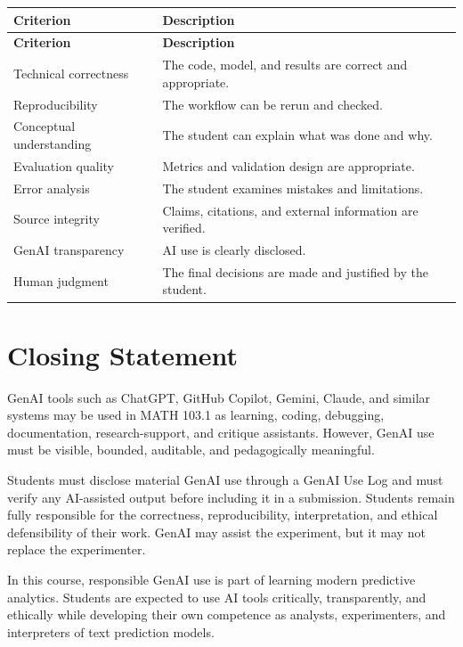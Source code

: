 \documentclass[11pt]{article}
\newcommand{\coursecode}{MATH 103.1}
\begin{document}
\begin{longtable}{p{}p{}}
\toprule
\textbf{Criterion} & \textbf{Description} \\
\midrule
\endfirsthead
\toprule
\textbf{Criterion} & \textbf{Description} \\
\midrule
\endhead
\bottomrule
\endfoot
Technical correctness & The code, model, and results are correct and appropriate. \\
Reproducibility & The workflow can be rerun and checked. \\
Conceptual understanding & The student can explain what was done and why. \\
Evaluation quality & Metrics and validation design are appropriate. \\
Error analysis & The student examines mistakes and limitations. \\
Source integrity & Claims, citations, and external information are verified. \\
GenAI transparency & AI use is clearly disclosed. \\
Human judgment & The final decisions are made and justified by the student. \\
\end{longtable}

\section{Closing Statement}

GenAI tools such as ChatGPT, GitHub Copilot, Gemini, Claude, and similar systems may be used in \coursecode{} as learning, coding, debugging, documentation, research-support, and critique assistants. However, GenAI use must be visible, bounded, auditable, and pedagogically meaningful.

Students must disclose material GenAI use through a GenAI Use Log and must verify any AI-assisted output before including it in a submission. Students remain fully responsible for the correctness, reproducibility, interpretation, and ethical defensibility of their work. GenAI may assist the experiment, but it may not replace the experimenter.

In this course, responsible GenAI use is part of learning modern predictive analytics. Students are expected to use AI tools critically, transparently, and ethically while developing their own competence as analysts, experimenters, and interpreters of text prediction models.
\end{document}

